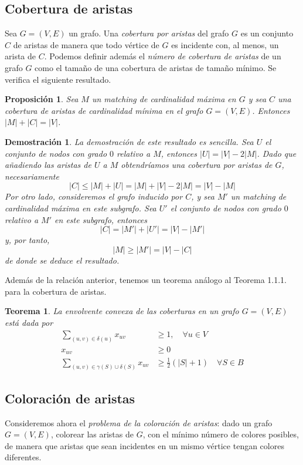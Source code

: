 \documentclass[twoside,a4paper,openright,12pt]{book}
\newtheorem{prop}{Proposici\'on}[section]
\newtheorem{thm}{Teorema}[section]
\newtheorem*{dem}{Demostración}
\begin{document}
\subsection{Cobertura de aristas}
Sea $G=(V,E)$ un grafo. Una \textit{cobertura por aristas} del grafo $G$ es un conjunto $C$ de aristas de manera que todo vértice de $G$ es incidente con, al menos, un arista de $C$. Podemos definir además el \textit{número de cobertura de aristas} de un grafo $G$ como el tamaño de una cobertura de aristas de tamaño mínimo. Se verifica el siguiente resultado.
\begin{prop}
Sea $M$ un matching de cardinalidad máxima en $G$ y sea $C$ una cobertura de aristas de cardinalidad mínima en el grafo $G=(V,E)$. Entonces $|M|+|C|=|V|$.
\end{prop}
\begin{dem}
La demostración de este resultado es sencilla. Sea $U$ el conjunto de nodos con grado $0$ relativo a $M$, entonces $|U|=|V|-2|M|$. Dado que añadiendo las aristas de $U$ a $M$ obtendríamos una cobertura por aristas de $G$, necesariamente
$$
|C| \leq |M|+|U| = |M| + |V|-2|M| = |V|-|M|
$$
Por otro lado, consideremos el grafo inducido por $C$, y sea $M'$ un matching de cardinalidad máxima en este subgrafo. Sea $U'$ el conjunto de nodos con grado $0$ relativo a $M'$ en este subgrafo, entonces
$$
|C| = |M'| +|U'| = |V|-|M'|
$$
y, por tanto,
$$
|M| \geq |M'| = |V|-|C|
$$
de donde se deduce el resultado.
\end{dem}
Además de la relación anterior, tenemos un teorema análogo al Teorema 1.1.1. para la cobertura de aristas.
\begin{thm}
La envolvente convexa de las coberturas en un grafo $G=(V,E)$ está dada por
\begin{align*}
\sum_{(u,v)\in\delta(u)} x_{uv} &\geq 1, \quad \forall u\in V\\
x_{uv} &\geq 0\\
\sum_{(u,v)\in \gamma(S)\cup\delta(S)} x_{uv}& \geq \frac{1}{2}(|S|+1)\quad \forall S \in B	
\end{align*}
\end{thm}


\subsection{Coloración de aristas}
Consideremos ahora el \textit{problema de la coloración de aristas}: dado un grafo $G=(V,E)$, colorear las aristas de $G$, con el mínimo número de colores posibles, de manera que aristas que sean incidentes en un mismo vértice tengan colores diferentes. 
\end{document}
